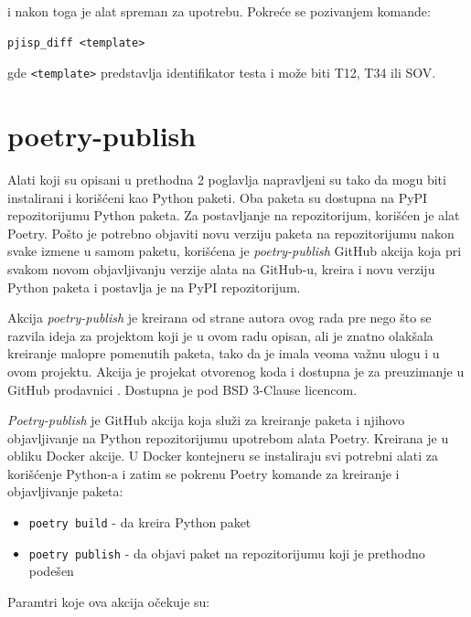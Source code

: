 \documentclass[12pt]{report}
\begin{document}
i nakon toga je alat spreman za upotrebu. Pokreće se pozivanjem komande:

\begin{verbatim}
pjisp_diff <template>
\end{verbatim}

gde \texttt{<template>} predstavlja identifikator testa i može biti T12, T34 ili SOV.

\section{poetry-publish}
Alati koji su opisani u prethodna 2 poglavlja napravljeni su tako da mogu biti instalirani i korišćeni kao Python paketi. Oba paketa su dostupna na PyPI repozitorijumu Python paketa. Za postavljanje na repozitorijum, korišćen je alat Poetry. Pošto je potrebno objaviti novu verziju paketa na repozitorijumu nakon svake izmene u samom paketu, korišćena je \textit{poetry-publish} \cite{poetry-publish-repo} GitHub akcija koja pri svakom novom objavljivanju verzije alata na GitHub-u, kreira i novu verziju Python paketa i postavlja je na PyPI repozitorijum.

Akcija \textit{poetry-publish} je kreirana od strane autora ovog rada pre nego što se razvila ideja za projektom koji je u ovom radu opisan, ali je znatno olakšala kreiranje malopre pomenutih paketa, tako da je imala veoma važnu ulogu i u ovom projektu. Akcija je projekat otvorenog koda i dostupna je za preuzimanje u GitHub prodavnici \cite{poetry-publish-marketplace}. Dostupna je pod BSD 3-Clause licencom.

\textit{Poetry-publish} je GitHub akcija koja služi za kreiranje paketa i njihovo objavljivanje na Python repozitorijumu upotrebom alata Poetry. Kreirana je u obliku Docker akcije. U Docker kontejneru se instaliraju svi potrebni alati za korišćenje Python-a i zatim se pokrenu Poetry komande za kreiranje i objavljivanje paketa:

\begin{itemize}
    \item \texttt{poetry build} - da kreira Python paket
    \item \texttt{poetry publish} - da objavi paket na repozitorijumu koji je prethodno podešen
\end{itemize}

Paramtri koje ova akcija očekuje su:
\end{document}
